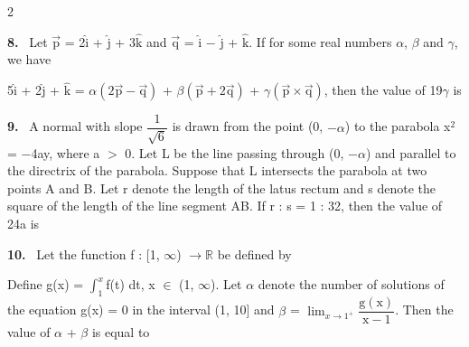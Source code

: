 \documentclass[10pt]{extarticle}
\newcommand{\qn}[1]{\par\smallskip\noindent\textbf{#1.}~}
\begin{document}
\begin{multicols}{2}
\qn{8} Let $\vec{\mathrm p}$ = 2$\hat{\mathrm i}$ + $\hat{\mathrm j}$ + 3$\hat{\mathrm k}$ and $\vec{\mathrm q}$ = $\hat{\mathrm i}$ $-$ $\hat{\mathrm j}$ + $\hat{\mathrm k}$. If for some real numbers $\alpha$, $\beta$ and $\gamma$, we have\par
5$\hat{\mathrm i}$ + 2$\hat{\mathrm j}$ + $\hat{\mathrm k}$ = $\alpha\left(2\vec{\mathrm p}-\vec{\mathrm q}\right)$ + $\beta\left(\vec{\mathrm p}+2\vec{\mathrm q}\right)$ + $\gamma\left(\vec{\mathrm p}\times\vec{\mathrm q}\right)$, then the value of 19$\gamma$ is \underline{\hspace{1.5cm}}
\qn{9} A normal with slope $\dfrac1{\sqrt6}$ is drawn from the point (0, $-\alpha$) to the parabola x$^2$ = $-$4ay, where a $>$ 0. Let L be the line passing through (0, $-\alpha$) and parallel to the directrix of the parabola. Suppose that L intersects the parabola at two points A and B. Let r denote the length of the latus rectum and s denote the square of the length of the line segment AB. If r : s = 1 : 32, then the value of 24a is \underline{\hspace{1.5cm}}
\qn{10} Let the function f : [1, $\infty$) $\to\mathbb R$ be defined by\par
\par\noindent{}\par
Define g(x) = $\displaystyle\int_1^{x}$f(t) dt, x $\in$ (1, $\infty$). Let $\alpha$ denote the number of solutions of the equation g(x) = 0 in the interval (1, 10] and $\beta$ = $\displaystyle\lim_{x\to1^+}\dfrac{\mathrm g(\mathrm x)}{\mathrm x-1}$. Then the value of $\alpha$ + $\beta$ is equal to \underline{\hspace{1.5cm}}
\end{multicols}
\end{document}
